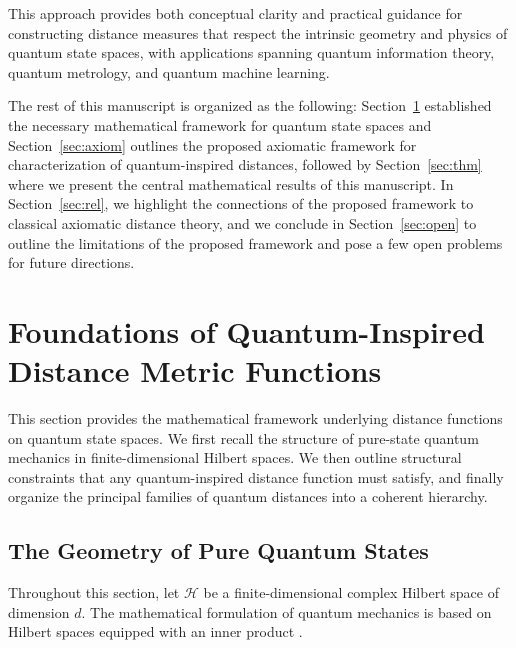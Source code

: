 \documentclass[aps,pra,reprint,nofootinbib,showpacs,superscriptaddress]{revtex4-1}
\begin{document}
This approach provides both conceptual clarity and practical guidance for constructing distance measures that respect the intrinsic geometry and physics of quantum state spaces, with applications spanning quantum information theory, quantum metrology, and quantum machine learning. 

The rest of this manuscript is organized as the following: Section~\ref{sec:found} established the necessary mathematical framework for quantum state spaces and Section~\ref{sec:axiom} outlines the proposed axiomatic framework for characterization of quantum-inspired distances, followed by Section~\ref{sec:thm} where we present the central mathematical results of this manuscript. In Section~\ref{sec:rel}, we highlight the connections of the proposed framework to classical axiomatic distance theory, and we conclude in Section~\ref{sec:open} to outline the limitations of the proposed framework and pose a few open problems for future directions. 









\section{Foundations of Quantum-Inspired Distance Metric Functions}
\label{sec:found}

This section provides the mathematical framework underlying distance
functions on quantum state spaces. We first recall the structure of
pure-state quantum mechanics in finite-dimensional Hilbert spaces.
We then outline structural constraints that any quantum-inspired
distance function must satisfy, and finally organize the principal
families of quantum distances into a coherent hierarchy.

\subsection{The Geometry of Pure Quantum States}

Throughout this section, let $\mathcal{H}$ be a finite-dimensional
complex Hilbert space of dimension $d$.
The mathematical formulation of quantum mechanics is based on
Hilbert spaces equipped with an inner product
\cite{vonNeumann1932,nielsen2010quantum,bengtsson2017geometry}.
\end{document}
